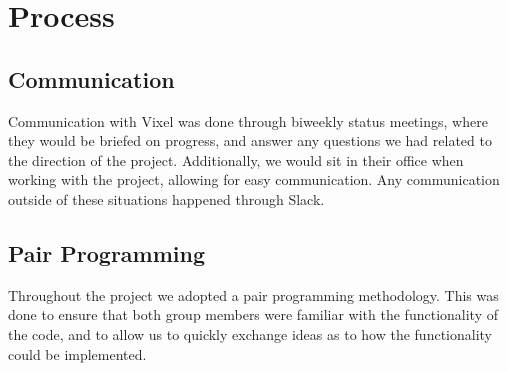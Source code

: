 \section{Process}
\subsection{Communication}
Communication with Vixel was done through biweekly status meetings, where they would be briefed on progress, and answer any questions we had related to the direction of the project. Additionally, we would sit in their office when working with the project, allowing for easy communication. Any communication outside of these situations happened through Slack.

\subsection{Pair Programming}
Throughout the project we adopted a pair programming methodology. This was done to ensure that both group members were familiar with the functionality of the code, and to allow us to quickly exchange ideas as to how the functionality could be implemented.
